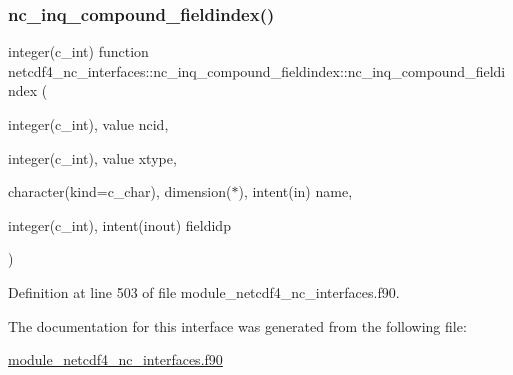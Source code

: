 \subsubsection{\texorpdfstring{nc\+\_\+inq\+\_\+compound\+\_\+fieldindex()}{nc\_inq\_compound\_fieldindex()}}
{\footnotesize\ttfamily integer(c\+\_\+int) function netcdf4\+\_\+nc\+\_\+interfaces\+::nc\+\_\+inq\+\_\+compound\+\_\+fieldindex\+::nc\+\_\+inq\+\_\+compound\+\_\+fieldindex (\begin{DoxyParamCaption}\item[{integer(c\+\_\+int), value}]{ncid,  }\item[{integer(c\+\_\+int), value}]{xtype,  }\item[{character(kind=c\+\_\+char), dimension($\ast$), intent(in)}]{name,  }\item[{integer(c\+\_\+int), intent(inout)}]{fieldidp }\end{DoxyParamCaption})}



Definition at line 503 of file module\+\_\+netcdf4\+\_\+nc\+\_\+interfaces.\+f90.



The documentation for this interface was generated from the following file\+:\begin{DoxyCompactItemize}
\item 
\hyperlink{module__netcdf4__nc__interfaces_8f90}{module\+\_\+netcdf4\+\_\+nc\+\_\+interfaces.\+f90}\end{DoxyCompactItemize}
